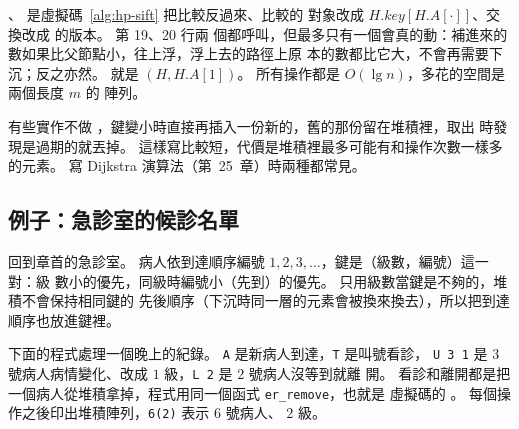 、 是虛擬碼~\ref{alg:hp-sift} 把比較反過來、比較的
對象改成 $H.\mathit{key}[H.A[\cdot]]$、交換改成  的版本。 第 19、20 行兩
個都呼叫，但最多只有一個會真的動：補進來的數如果比父節點小，往上浮，浮上去的路徑上原
本的數都比它大，不會再需要下沉；反之亦然。  就是
$(H, H.A[1])$。 所有操作都是 $O(\lg n)$，多花的空間是兩個長度 $m$ 的
陣列。

有些實作不做 ，鍵變小時直接再插入一份新的，舊的那份留在堆積裡，取出
時發現是過期的就丟掉。 這樣寫比較短，代價是堆積裡最多可能有和操作次數一樣多的元素。
寫 Dijkstra 演算法（第~25~章）時兩種都常見。

\subsection{例子：急診室的候診名單}

回到章首的急診室。 病人依到達順序編號 $1, 2, 3, \ldots$，鍵是（級數，編號）這一對：級
數小的優先，同級時編號小（先到）的優先。 只用級數當鍵是不夠的，堆積不會保持相同鍵的
先後順序（下沉時同一層的元素會被換來換去），所以把到達順序也放進鍵裡。

下面的程式處理一個晚上的紀錄。 \texttt{A} 是新病人到達，\texttt{T} 是叫號看診，
\texttt{U 3 1} 是 $3$ 號病人病情變化、改成 $1$ 級，\texttt{L 2} 是 $2$ 號病人沒等到就離
開。 看診和離開都是把一個病人從堆積拿掉，程式用同一個函式 \texttt{er\_remove}，也就是
虛擬碼的 。 每個操作之後印出堆積陣列，\texttt{6(2)} 表示 $6$ 號病人、
$2$ 級。

